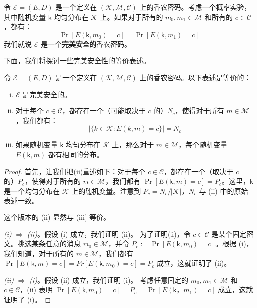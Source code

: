 \begin{definition}[完美安全性]\label{def:2-1}
令 $\mathcal{E}=(E,D)$ 是一个定义在 $(\mathcal{K},\mathcal{M},\mathcal{C})$ 上的香农密码。考虑一个概率实验，其中随机变量 $\mathsf{k}$ 均匀分布在 $\mathcal{K}$ 上。如果对于所有的 $m_0,m_1\in\mathcal{M}$ 和所有的 $c\in\mathcal{C}$，都有：
\[
\Pr[E(\mathsf{k},m_0)=c]=\Pr[E(\mathsf{k},m_1)=c]
\]
我们就说 $\mathcal{E}$ 是一个\textbf{完美安全的}香农密码。
\end{definition}

下面，我们将探讨一些完美安全性的等价表述。

\begin{theorem}\label{theo:2-1}
令 $\mathcal{E}=(E,D)$ 是一个定义在 $(\mathcal{K},\mathcal{M},\mathcal{C})$ 上的香农密码。以下表述是等价的：
\begin{enumerate}[(i)]
	\item $\mathcal{E}$ 是完美安全的。
	\item 对于每个 $c\in\mathcal{C}$，都存在一个（可能取决于 $c$ 的）$N_c$，使得对于所有 $m\in\mathcal{M}$，我们都有：
	\[
    \big\lvert\{k\in\mathcal{K}:E(k,m)=c\}\big\rvert = N_c
    \]
    \item 如果随机变量 $\mathsf{k}$ 均匀分布在 $\mathcal{K}$ 上，那么对于 $m\in\mathcal{M}$，每个随机变量 $E(\mathsf{k},m)$ 都有相同的分布。
\end{enumerate}
\end{theorem}

\begin{proof}
首先，让我们把(ii)重述如下：对于每个 $c\in\mathcal{C}$，都存在一个（取决于 $c$ 的）$P_c$，使得对于所有的 $m\in\mathcal{M}$，我们都有 $\Pr[E(\mathsf{k},m)=c]=P_c$。这里，$\mathsf{k}$ 是一个均匀分布在 $\mathcal{K}$ 上的随机变量。注意到 $P_c=N_c/|\mathcal{K}|$，$N_c$ 与 (ii) 中的原始表述一致。

这个版本的 (ii) 显然与 (iii) 等价。

\vspace{5pt}

\emph{(i)} $\Longrightarrow$ \emph{(ii)}。假设 (i) 成立，我们证明 (ii)。
为了证明(ii)，令 $c\in\mathcal{C}$ 是某个固定密文。挑选某条任意的消息 $m_0\in\mathcal{M}$，并令 $P_c:=\Pr[E(\mathsf{k},m_0)=c]$。根据 (i)，我们知道，对于所有的 $m\in\mathcal{M}$，我们都有 $\Pr[E(\mathsf{k},m)=c]=Pr[E(\mathsf{k},m_0)=c]=P_c$ 成立，这就证明了 (ii)。

\emph{(ii)} $\Longrightarrow$ \emph{(i)}。假设 (ii) 成立，我们证明 (i)。
考虑任意固定的 $m_0,m_1\in\mathcal{M}$ 和 $c\in\mathcal{C}$，(ii) 表明 $\Pr[E(\mathsf{k},m_0)=c]=P_c=\Pr[E(\mathsf{k}，m_1)=c]$ 成立，这就证明了 (i)。
\end{proof}

